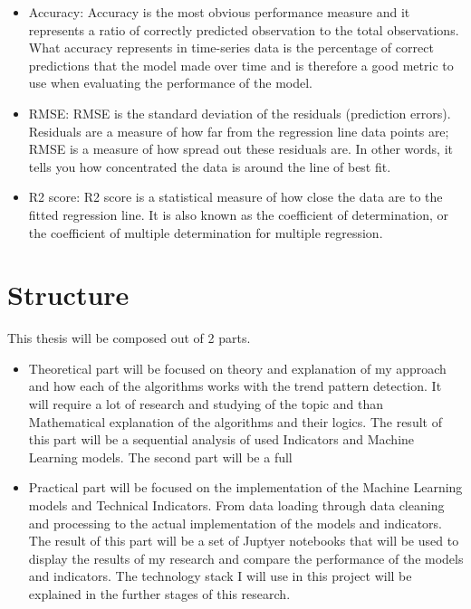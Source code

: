 \documentclass{imc-inf}
\begin{document}
\begin{enumerate}
\begin{itemize}
\begin{itemize}
				\item Accuracy: Accuracy is the most obvious performance measure and it represents a ratio of correctly predicted observation to the total observations.
				What accuracy represents in time-series data is the percentage of correct predictions that the model made over time and is therefore a good metric to use when evaluating the performance of the model.
				\item RMSE: RMSE is the standard deviation of the residuals (prediction errors).
				Residuals are a measure of how far from the regression line data points are;
				RMSE is a measure of how spread out these residuals are. In other words, it tells you how concentrated the data is around the line of best fit.
				\item R2 score: R2 score is a statistical measure of how close the data are to the fitted regression line. It is also known as the coefficient of determination,
				or the coefficient of multiple determination for multiple regression.
			\end{itemize}

	
		\end{itemize}
\end{enumerate}

\section{Structure}
This thesis will be composed out of 2 parts.

	\begin{itemize}
		\item Theoretical part will be focused on
		theory and explanation of my approach and how each of the algorithms works with
		the trend pattern detection. It will require a lot of research and studying of the topic and than Mathematical
		explanation of the algorithms and their logics. The result of this part will be a sequential analysis of used Indicators and Machine Learning models.
		The second part will be a full
		\item Practical part will be focused on the implementation of the Machine Learning models and Technical Indicators.
		From data loading through data cleaning and processing to the actual implementation of the models and indicators.
		The result of this part will be a set of Juptyer notebooks that will be used to display the results of my research
		and compare the performance of the models and indicators. The technology stack I will use in this project will be
		explained in the further stages of this research. 
	\end{itemize}
\end{document}
